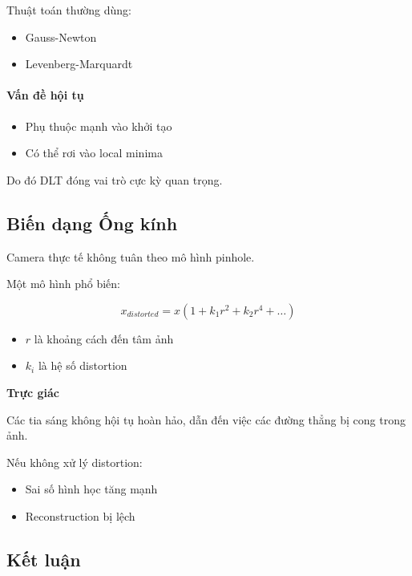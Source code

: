 Thuật toán thường dùng:
\begin{itemize}
	\item Gauss-Newton
	\item Levenberg-Marquardt
\end{itemize}

\paragraph{Vấn đề hội tụ}

\begin{itemize}
	\item Phụ thuộc mạnh vào khởi tạo
	\item Có thể rơi vào local minima
\end{itemize}

Do đó DLT đóng vai trò cực kỳ quan trọng.

\subsection{Biến dạng Ống kính}
\label{subsec:distortion}

Camera thực tế không tuân theo mô hình pinhole.

Một mô hình phổ biến:

\[
x_{distorted} = x (1 + k_1 r^2 + k_2 r^4 + \dots)
\]

\begin{itemize}
	\item $r$ là khoảng cách đến tâm ảnh
	\item $k_i$ là hệ số distortion
\end{itemize}

\begin{mdframed}[style=infobox]
	\textbf{Trực giác}
	
	Các tia sáng không hội tụ hoàn hảo, dẫn đến việc các đường thẳng bị cong trong ảnh.
\end{mdframed}

Nếu không xử lý distortion:
\begin{itemize}
	\item Sai số hình học tăng mạnh
	\item Reconstruction bị lệch
\end{itemize}

\subsection{Kết luận}
\label{subsec:calibration_conclusion}

